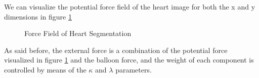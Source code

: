 We can visualize the potential force field of the heart image for both the x and y dimensions in figure
\ref{fig:ffhx}

\begin{figure}[!hbt]
\centering   
{}
\caption{Force Field of Heart Segmentation}
\label{fig:ffhx}
\end{figure}

As said before, the external force is a combination of the potential force visualized in figure \ref{fig:ffhx} and the balloon force, and the weight of each component is controlled by means of the
$\kappa$ and $\lambda$ parameters.
